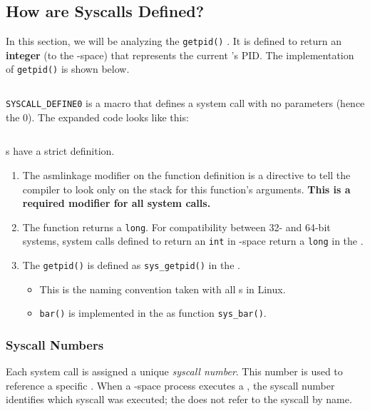 \subsection{How are Syscalls Defined?}\label{subsec:How_Syscalls_Defined}
In this section, we will be analyzing the \texttt{getpid()} .
It is defined to return an \textbf{integer} (to the -space) that represents the current 's PID.\@
The implementation of \texttt{getpid()} is shown below.
\inputminted[frame=lines,linenos]{c}{./EDAF35-Operating_Systems-Sections/System_Calls/Code/getpid_Implementation.c}

\texttt{SYSCALL_DEFINE0} is a macro that defines a system call with no parameters (hence the 0).
The expanded code looks like this:
\inputminted[frame=lines,linenos]{c}{./EDAF35-Operating_Systems-Sections/System_Calls/Code/getpid_Expanded.c}

s have a strict definition.
\begin{enumerate}[noitemsep]
\item The asmlinkage modifier on the function definition is a directive to tell the compiler to look only on the stack for this function’s arguments.
  \textbf{This is a required modifier for all system calls.}
\item The function returns a \texttt{long}.
  For compatibility between 32- and 64-bit systems, system calls defined to return an \texttt{int} in -space return a \texttt{long} in the .
\item The \texttt{getpid()}  is defined as \texttt{sys_getpid()} in the .
  \begin{itemize}[noitemsep]
  \item This is the naming convention taken with all s in Linux.
  \item {} \texttt{bar()} is implemented in the  as function \texttt{sys_bar()}.
  \end{itemize}
\end{enumerate}

\subsubsection{Syscall Numbers}\label{subsubsec:Syscall_Numbers}
\begin{definition}\label{def:Syscall_Number}
  Each system call is assigned a unique \emph{syscall number}.
  This number is used to reference a specific .
  When a -space process executes a , the syscall number identifies which syscall was executed; the  does not refer to the syscall by name.
\end{definition}


